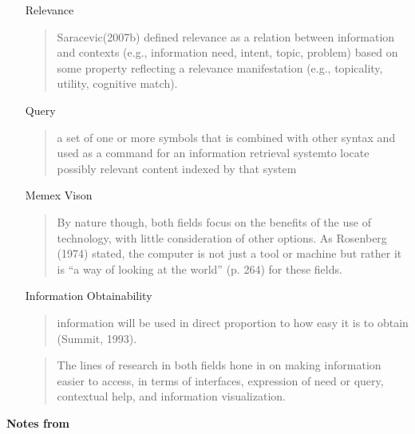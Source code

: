 \documentclass{article}
\newcommand{\hi}[1]{{\large {\bf #1}}}
\begin{document}
\begin{itemize}
    \item[Relevance]
        \begin{quote}
            Saracevic(2007b) defined relevance as a relation between information and contexts (e.g., information need, intent, topic, problem) based on some property reflecting a relevance manifestation (e.g., topicality, utility, cognitive match).
        \end{quote}

    \item[Query]
        \begin{quote}
            a set of one or more symbols that is combined with other syntax and used as a command for an information retrieval systemto locate possibly relevant content indexed by that system
        \end{quote}

    \item[Memex Vison]
        \begin{quote}
             By nature though, both fields focus on the benefits of the use of technology, with little consideration of other options. As Rosenberg (1974) stated, the computer is not just a tool or machine but rather it is “a way of looking at the world” (p. 264) for these fields.
        \end{quote}

    \item[Information Obtainability]
        \begin{quote}
            information will be  used  in  direct  proportion  to  how  easy  it  is  to  obtain (Summit, 1993).
        \end{quote}

        \begin{quote}
            The lines of research in both fields hone in on making information easier to access, in terms of interfaces, expression of need or query, contextual help, and information visualization.
        \end{quote}


\end{itemize}

\hi{Notes from \cite{fuhr08}}
\end{document}
